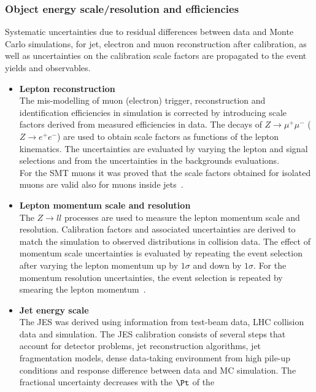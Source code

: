\subsubsection{Object energy scale/resolution and efficiencies} 
Systematic uncertainties due to residual differences between data and
Monte Carlo simulations, for jet, electron and muon reconstruction
after calibration, as well as uncertainties on the calibration scale
factors are propagated to the event yields and observables.

\begin{itemize}
	\item \textbf{Lepton reconstruction} \\ 
	The mis-modelling of muon (electron) trigger, reconstruction and
	identification efficiencies in simulation is corrected by introducing
	scale factors derived from measured efficiencies in data. The decays
	of $Z \to \mu^+ \mu^-$ ($Z \to e^+ e^-$) are used to obtain scale
	factors as functions of the lepton kinematics. The uncertainties are
	evaluated by varying the lepton and signal selections and from the
	uncertainties in the backgrounds evaluations. \\
	For the SMT muons it was proved that the scale factors obtained for
	isolated muons are valid also for muons inside jets~\cite{SMT-INT-13TeV}. 
	\item \textbf{Lepton momentum scale and resolution} \\ 
	The $Z \to ll$ processes are used to measure the lepton momentum scale
	and resolution. Calibration factors and associated uncertainties are
	derived to match the simulation to observed distributions in collision
	data. The effect of momentum scale uncertainties is evaluated by
	repeating the event selection after varying the lepton momentum up by
	$1\sigma$ and down by $1\sigma$. For the momentum resolution
	uncertainties, the event selection is repeated by smearing the lepton
	momentum~\cite{PERF-2013-05}.
	\item \textbf{Jet energy scale} \\ 
	The JES was derived using information from test-beam data, LHC
	collision data and simulation. The JES calibration consists of several
	steps that account for detector problems, jet reconstruction
	algorithms, jet fragmentation models, dense data-taking environment
	from high pile-up conditions and response difference between data and
	MC simulation. 
	The fractional uncertainty decreases with the $\Pt$ of the

\end{itemize}
